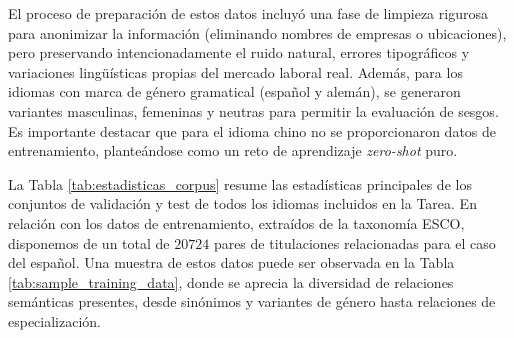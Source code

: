 El proceso de preparación de estos datos incluyó una fase de limpieza rigurosa para anonimizar la información (eliminando nombres de empresas o ubicaciones), pero preservando intencionadamente el ruido natural, errores tipográficos y variaciones lingüísticas propias del mercado laboral real. Además, para los idiomas con marca de género gramatical (español y alemán), se generaron variantes masculinas, femeninas y neutras para permitir la evaluación de sesgos. Es importante destacar que para el idioma chino no se proporcionaron datos de entrenamiento, planteándose como un reto de aprendizaje \textit{zero-shot} puro.

\begin{table}[!ht]
    \centering
    \caption{Resumen estadístico de los conjuntos de validación y test de la  por idioma (EN: Inglés, ES: Español, DE: Alemán, ZH: Chino).}
    \label{tab:estadisticas_corpus}
\end{table}

La Tabla \ref{tab:estadisticas_corpus} resume las estadísticas principales de los conjuntos de validación y test de todos los idiomas incluidos en la \gls{Tarea}. En relación con los datos de entrenamiento, extraídos de la taxonomía \gls{ESCO}, disponemos de un total de $20724$ pares de titulaciones relacionadas para el caso del español. Una muestra de estos datos puede ser observada en la Tabla \ref{tab:sample_training_data}, donde se aprecia la diversidad de relaciones semánticas presentes, desde sinónimos y variantes de género hasta relaciones de especialización.

